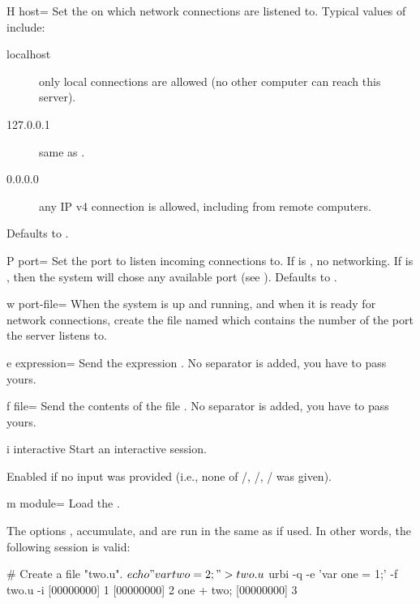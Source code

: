 \begin{options}[Networking]
\item[H]{host=} Set the  on which network
  connections are listened to.  Typical values of 
  include:
  \begin{sublist}
    \begin{description}
    \item[localhost] only local connections are allowed (no other
      computer can reach this server).
    \item[127.0.0.1] same as .
    \item[0.0.0.0] any IP v4 connection is allowed, including from
      remote computers.
  \end{description}
  \end{sublist}
  Defaults to .
\item[P]{port=} Set the port to listen incoming connections to.
  If  is , no networking.  If  is ,
  then the system will chose any available port (see ).
  Defaults to .
\item[w]{port-file=} When the system is up and running, and when
  it is ready for network connections, create the file named 
  which contains the number of the port the server listens to.
\end{options}


\begin{options}[Execution]
\item[e]{expression=} Send the \us expression .
  No separator is added, you have to pass yours.
\item[f]{file=} Send the contents of the file .
  No separator is added, you have to pass yours.
\item[i]{interactive} Start an interactive session.

  Enabled if no input was provided (i.e., none of
  /, /,
  / was given).
\item[m]{module=} Load the \UObject {}.
\end{options}

The options ,  accumulate, and are run in the
same  as  if used.  In other words, the
following session is valid:

\begin{shell}[alsolanguage={[interactive]urbiscript}]
# Create a file "two.u".
$ echo "var two = 2;" >two.u
$ urbi -q -e 'var one = 1;' -f two.u -i
[00000000] 1
[00000000] 2
one + two;
[00000000] 3
\end{shell}%



